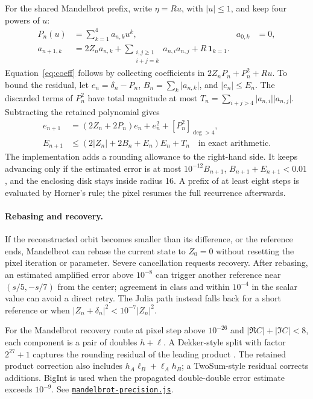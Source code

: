 \documentclass[11pt,a4paper]{article}
\numberwithin{equation}{section}
\newcommand{\abs}[1]{\lvert#1\rvert}
\newcommand{\code}[1]{\texttt{#1}}
\begin{document}
For the shared Mandelbrot prefix, write \(\eta=Ru\), with \(\abs u\le1\), and keep
four powers of \(u\):
\begin{align}
  P_n(u)&=\sum_{k=1}^4 a_{n,k}u^k,
  & a_{0,k}&=0,\\
  a_{n+1,k}
    &=2Z_n a_{n,k}
       +\sum_{\substack{i,j\ge1\\i+j=k}}a_{n,i}a_{n,j}
       +R\,\mathbf1_{k=1}. \label{eq:coeff}
\end{align}
Equation~\eqref{eq:coeff} follows by collecting coefficients in
\(2Z_nP_n+P_n^2+Ru\). To bound the residual, let
\(e_n=\delta_n-P_n\), \(B_n=\sum_k\abs{a_{n,k}}\), and
\(\abs{e_n}\le E_n\). The discarded terms of \(P_n^2\) have total
magnitude at most \(T_n=\sum_{i+j>4}\abs{a_{n,i}}\abs{a_{n,j}}\).
Subtracting the retained polynomial gives
\begin{align}
  e_{n+1}&=(2Z_n+2P_n)e_n+e_n^2+
             [P_n^2]_{\deg>4},\\
  E_{n+1}&\le(2\abs{Z_n}+2B_n+E_n)E_n+T_n
             \quad\text{in exact arithmetic}. \label{eq:poly-error}
\end{align}
The implementation adds a rounding allowance to the right-hand side.
It keeps advancing only if the estimated error is at most
\(10^{-12}B_{n+1}\), \(B_{n+1}+E_{n+1}<0.01\), and the enclosing disk
stays inside radius 16. A prefix of at least eight steps is evaluated
by Horner's rule; the pixel resumes the full recurrence afterwards.

\paragraph{Rebasing and recovery.}
If the reconstructed orbit becomes smaller than its difference, or
the reference ends, Mandelbrot can rebase the current state to \(Z_0=0\)
without resetting the pixel iteration or parameter. Severe cancellation
requests recovery. After rebasing, an estimated amplified error above
\(10^{-8}\) can trigger another reference near \((s/5,-s/7)\) from the
center; agreement in class and within \(10^{-4}\) in the scalar value
can avoid a direct retry. The Julia path instead falls back for a short
reference or when
\(\abs{Z_n+\delta_n}^2<10^{-7}\abs{Z_n}^2\).

For the Mandelbrot recovery route at pixel step above \(10^{-26}\) and
\(\abs{\Re C}+\abs{\Im C}<8\), each component is a pair of doubles
\(h+\ell\). A Dekker-style split with factor \(2^{27}+1\) captures the
rounding residual of the leading product \cite{dekker}. The retained
product correction also includes \(h_A\ell_B+\ell_Ah_B\); a TwoSum-style
residual corrects additions. BigInt is used when the propagated
double-double error estimate exceeds \(10^{-9}\).
See \href{../dist/mandelbrot-precision.js}{\code{mandelbrot-precision.js}}.
\end{document}
